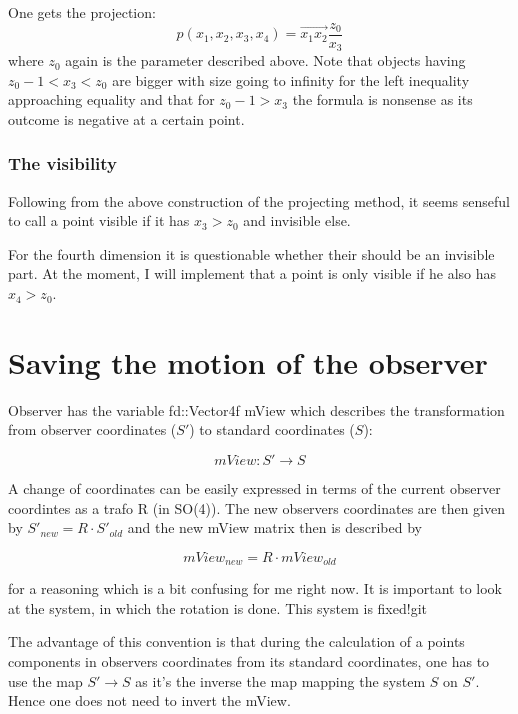 \documentclass[titlepage]{scrartcl}
\begin{document}
One gets the projection:
\begin{equation}
p(x_1, x_2, x_3, x_4) =  \vec{x_1 x_2} \frac{z_0}{x_3}
\end{equation}
where $z_0$ again is the parameter described above. Note that objects having $z_0 - 1 < x_3 < z_0$ are bigger with size going to infinity for the left inequality approaching equality and that for $z_0 - 1 > x_3$ the formula is nonsense as its outcome is negative at a certain point. 

\subsubsection{The visibility}

Following from the above construction of the projecting method, it seems senseful to call a point visible if it has $x_3 > z_0$ and invisible else. 

For the fourth dimension it is questionable whether their should be an invisible part. At the moment, I will implement that a point is only visible if he also has $x_4 > z_0$. 

\section{Saving the motion of the observer}

Observer has the variable fd::Vector4f mView which describes the transformation from observer coordinates ($S'$) to standard coordinates ($S$):

\begin{equation}
mView: S' \to S
\end{equation}

A change of coordinates can be easily expressed in terms of the current observer coordintes as a trafo R (in SO(4)). The new observers coordinates are then given by $S'_{new} = R \cdot S'_{old}$ and the new mView matrix then is described by 

\begin{equation}
mView_{new} = R \cdot mView_{old} 
\end{equation}

for a reasoning which is a bit confusing for me right now. It is important to look at the system, in which the rotation is done. This system is fixed!git 

The advantage of this convention is that during the calculation of a points components in observers coordinates from its standard coordinates, one has to use the map $S' \to S$ as it's the inverse the map mapping the system $S$ on $S'$. Hence one does not need to invert the mView.
\end{document}
